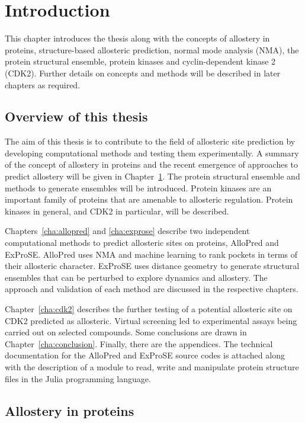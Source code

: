 \chapter{Introduction}
\label{cha:introduction}

This chapter introduces the thesis along with the concepts of allostery in proteins, structure-based allosteric prediction, normal mode analysis (NMA), the protein structural ensemble, protein kinases and cyclin-dependent kinase 2 (CDK2).
Further details on concepts and methods will be described in later chapters as required.


\section{Overview of this thesis}
\label{sec:introduction_overview}

The aim of this thesis is to contribute to the field of allosteric site prediction by developing computational methods and testing them experimentally.
A summary of the concept of allostery in proteins and the recent emergence of approaches to predict allostery will be given in Chapter~\ref{cha:introduction}.
The protein structural ensemble and methods to generate ensembles will be introduced.
Protein kinases are an important family of proteins that are amenable to allosteric regulation.
Protein kinases in general, and CDK2 in particular, will be described.

Chapters~\ref{cha:allopred} and \ref{cha:exprose} describe two independent computational methods to predict allosteric sites on proteins, AlloPred and ExProSE.
AlloPred uses NMA and machine learning to rank pockets in terms of their allosteric character.
ExProSE uses distance geometry to generate structural ensembles that can be perturbed to explore dynamics and allostery.
The approach and validation of each method are discussed in the respective chapters.

Chapter~\ref{cha:cdk2} describes the further testing of a potential allosteric site on CDK2 predicted as allosteric.
Virtual screening led to experimental assays being carried out on selected compounds.
Some conclusions are drawn in Chapter~\ref{cha:conclusion}.
Finally, there are the appendices.
The technical documentation for the AlloPred and ExProSE source codes is attached along with the description of a module to read, write and manipulate protein structure files in the Julia programming language.


\section{Allostery in proteins}
\label{sec:introduction_allostery}

